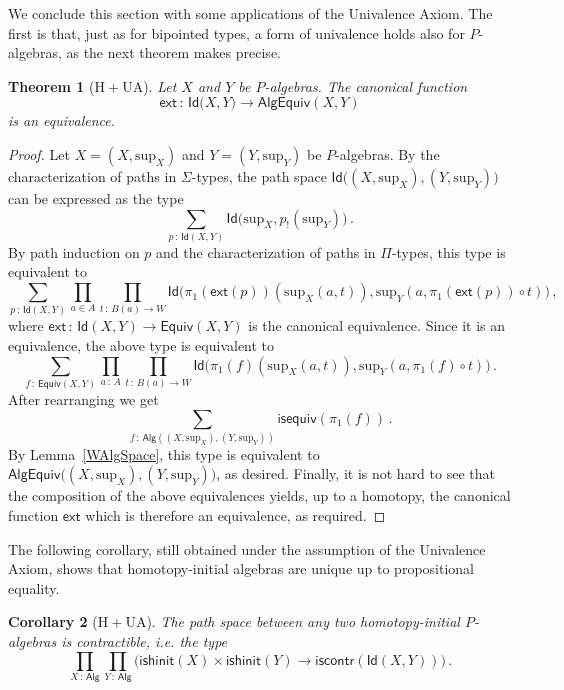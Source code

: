 \documentclass[10pt,a4paper,oneside,reqno]{amsart}
\theoremstyle{mythm}
\newtheorem{theorem}{Theorem}[section]
\newtheorem{corollary}[theorem]{Corollary}
\theoremstyle{mydef}
\theoremstyle{myrmk}
\newcommand{\co}{\,{:}\,}
\newcommand{\Hint}{\mathrm{H}}
\newcommand{\UA}{\mathrm{UA}}
\newcommand{\iscontr}{\mathsf{iscontr}}
\newcommand{\isequiv}{\mathsf{isequiv}}
\newcommand{\isalghinit}{\mathsf{ishinit}}
\newcommand{\ext}{\mathsf{ext}}
\newcommand{\Id}{\mathsf{Id}}
\newcommand{\Palg}{\mathsf{Alg}}
\renewcommand{\sup}{\mathrm{sup}}
\newcommand{\AlgEquiv}{\mathsf{AlgEquiv}}
\begin{document}
\medskip

We conclude this section with some applications of the Univalence Axiom. The first is that, just as for bipointed 
types, a form of univalence holds also for $P$-algebras, as the next theorem makes precise. 


\begin{theorem}[$\Hint + \UA$] \label{thm:Punivalence}
Let $X$ and $Y$ be $P$-algebras. The canonical function
\[ 
\ext \co \Id \big(X,Y\big) \to  \AlgEquiv(X,Y) 
\]
is an equivalence.
\end{theorem}

\begin{proof} 
Let $X = (X,\sup_X)$ and $Y= (Y,\sup_Y)$ be $P$-algebras. By the characterization of paths in $\Sigma$-types, the path space 
$\Id \big( (X,\sup_X) ,  (Y,\sup_Y) \big)$ can be expressed as the type
\[
\sum_{p \co \Id(X, Y)} \Id \big( \sup_X ,  p_{!}(\sup_Y)  \big) \, .
\]
By path induction on $p$ and the characterization of paths in $\Pi$-types, this type is equivalent to
\[  
\sum_{p \co \Id(X,Y)}  
\prod_{a \in A} 
\prod_{t \co B(a) \to W} 
\Id \big(  \pi_1(\ext(p))( \sup_X(a,t)),  \sup_Y(a, \pi_1(\ext (p)) \circ t) \big) \, , 
\]
where $\ext \co \Id(X,Y) \to \mathsf{Equiv}(X,Y)$ is the canonical equivalence. Since it is an equivalence, the above type is equivalent to
\[
\sum_{f \co \mathsf{Equiv}(X,Y)} \prod_{a \co A} \prod_{t \co B(a) \to W} \Id \big( \pi_1(f) (\sup_X(a,t))  , \sup_Y (a, \pi_1(f) \circ t) \big) \, .
\]
After rearranging we get
\[
\sum_{f \co \Palg ( (X,\sup_X),  (Y,\sup_Y) )}  \isequiv(\pi_1(f)) \, .
\]
By Lemma~\ref{WAlgSpace}, this type is equivalent to $\AlgEquiv \big( (X,\sup_X),  (Y,\sup_Y)\big)$, as desired. Finally, it is not hard to see that the composition of the above equivalences yields, up to a homotopy, the canonical function $\ext$ which is therefore an equivalence, as required.
\end{proof} 

The following corollary, still obtained under the assumption of the Univalence Axiom, shows that
homotopy-initial algebras are unique up to propositional equality. 

\begin{corollary}[$\Hint + \UA$] \label{WHInitIso}
The path space between any two homotopy-initial $P$-algebras is contractible, i.e. the type
\[ 
\prod_{X \co \Palg} \prod_{Y \co \Palg}  \Big( \isalghinit(X) \times \isalghinit(Y)  \to 
\iscontr(\Id(X,Y)) \Big) \, .
\] 
\end{corollary}
\end{document}
